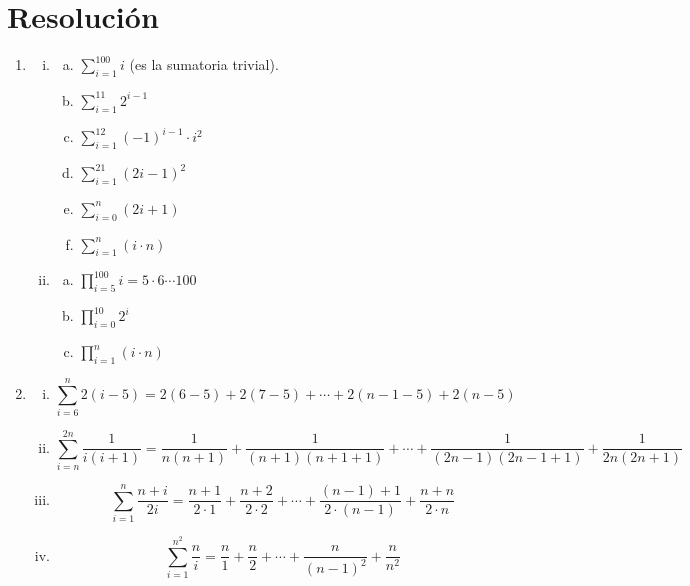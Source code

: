\documentclass[12pt]{book}
\begin{document}
\section{Resoluci\'on}
\begin{enumerate}
\item 
	\begin{enumerate}[i)]
	\item %
	\begin{enumerate}[a)]
	\item $ \sum_{i=1}^{100}i $ \qquad (es la sumatoria trivial).
	\item $ \sum_{i=1}^{11}2^{i-1} $ 	
	\item $ \sum_{i=1}^{12}(-1)^{i-1} \cdot i^2 $		
	\item $ \sum_{i=1}^{21}(2i-1)^{2} $ 	
	\item $ \sum_{i=0}^{n}(2i+1) $ 		
	\item $ \sum_{i=1}^{n}(i\cdot n) $ 			
	\end{enumerate}
	
	
	
	\item %
	
	\begin{enumerate}[a)]
	\item $ \prod_{i=5}^{100}i=5\cdot 6\cdots 100  $ 
	\item $ \prod_{i=0}^{10}2^i $ 
	\item $ \prod_{i=1}^{n}(i \cdot n) $ 	
	\end{enumerate}
	
	
	\end{enumerate}
\item %
	\begin{enumerate}[i)]
	\item
\[
\sum_{i=6}^{n}2(i-5) = 2(6-5)+2(7-5)+ \cdots + 2(n-1-5)+2(n-5)
\]

	\item 

\[
\sum_{i=n}^{2n} \frac{1}{i(i+1)}= \frac{1}{n(n+1)} + \frac{1}{(n+1)(n+1+1)} + \cdots + \frac{1}{(2n-1)(2n-1+1)} + \frac{1}{2n(2n+1)}
\]
	
	\item 
\[
\sum_{i=1}^{n}\frac{n+i}{2i} = \frac{n+1}{2 \cdot 1}+\frac{n+2}{2 \cdot 2}+ \cdots + \frac{(n-1)+1}{2 \cdot (n-1)}+\frac{n+n}{2 \cdot n}
\]
	
	\item 
\[
\sum_{i=1}^{n^2}\frac{n}{i} = \frac{n}{1}+\frac{n}{2}+ \cdots + \frac{n}{(n-1)^2}+\frac{n}{n^2}
\]



\end{enumerate}
\end{enumerate}
\end{document}
